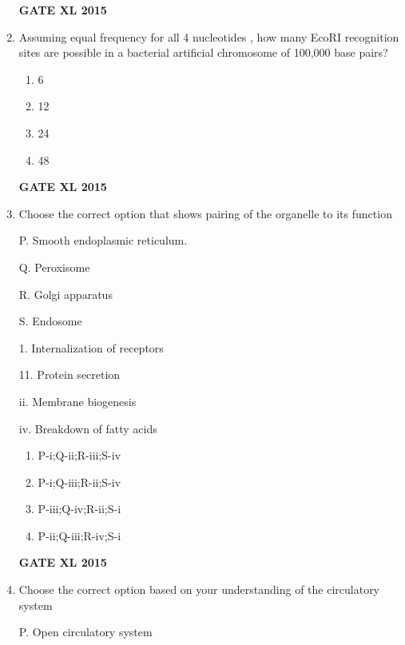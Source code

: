 \documentclass[journal,12pt,onecolumn]{IEEEtran}
\begin{document}
\begin{enumerate}
\hfill{\textbf{GATE XL 2015}}
\item Assuming equal frequency for all 4 nucleotides , how many EcoRI recognition sites  are possible in a bacterial artificial chromosome of 100,000 base pairs?
    \begin{enumerate}
            \item 6
	    \item 12
	    \item 24
            \item 48
    \end{enumerate}
\hfill{\textbf{GATE XL 2015}}
\item  Choose the correct option that shows pairing of the organelle to its function



	\begin{minipage}{0.5\textwidth}\begin{flushleft}
P. Smooth endoplasmic reticulum.

Q. Peroxisome

R. Golgi apparatus

S. Endosome
	\end{flushleft}
	\end{minipage}
	\begin{minipage}{0.5\textwidth}\begin{flushleft}
1. Internalization of receptors

11. Protein secretion

ii. Membrane biogenesis 

iv. Breakdown of fatty acids
	\end{flushleft}
	\end{minipage}
    \begin{enumerate}
            \item P-i;Q-ii;R-iii;S-iv
            \item P-i;Q-iii;R-ii;S-iv
            \item P-iii;Q-iv;R-ii;S-i
            \item P-ii;Q-iii;R-iv;S-i
    \end{enumerate}
\hfill{\textbf{GATE XL 2015}}

\item Choose the correct option based on your understanding of the circulatory system

	\begin{minipage}{0.5\textwidth}\begin{flushleft}
P. Open circulatory system


\end{flushleft}
\end{minipage}
\end{enumerate}
\end{document}
